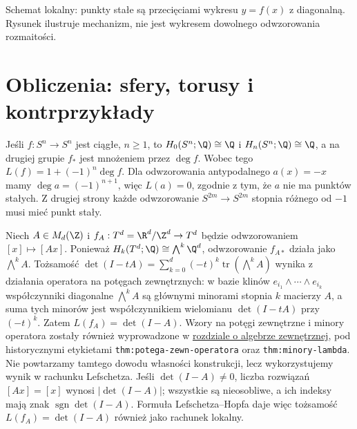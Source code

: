 \begin{center}
\end{center}
\begin{center}\small Schemat lokalny: punkty stałe są przecięciami
wykresu $y=f(x)$ z diagonalną. Rysunek ilustruje mechanizm,
nie jest wykresem dowolnego odwzorowania rozmaitości.\end{center}

\section{Obliczenia: sfery, torusy i kontrprzykłady}
\begin{przyklad}
Jeśli $f:S^n\to S^n$ jest ciągłe, $n\ge1$,
to $H_0(S^n;\Q)\cong\Q$ i $H_n(S^n;\Q)\cong\Q$,
a na drugiej grupie $f_*$ jest mnożeniem przez $\deg f$.
Wobec tego $L(f)=1+(-1)^n\deg f$.
Dla odwzorowania antypodalnego $a(x)=-x$ mamy
$\deg a=(-1)^{n+1}$, więc $L(a)=0$, zgodnie z tym,
że $a$ nie ma punktów stałych.
Z drugiej strony każde odwzorowanie $S^{2m}\to S^{2m}$
stopnia różnego od $-1$ musi mieć punkt stały.
\end{przyklad}

\begin{przyklad}
Niech $A\in M_d(\Z)$ i $f_A:T^d=\R^d/\Z^d\to T^d$
będzie odwzorowaniem $[x]\mapsto[Ax]$. Ponieważ
$H_k(T^d;\Q)\cong\bigwedge^k\Q^d$,
odwzorowanie $f_{A*}$ działa jako $\bigwedge^k A$.
Tożsamość
$\det(I-tA)=\sum_{k=0}^d(-t)^k
 \operatorname{tr}(\bigwedge^kA)$ wynika z działania
operatora na potęgach zewnętrznych: w bazie klinów
$e_{i_1}\wedge\cdots\wedge e_{i_k}$ współczynniki
diagonalne $\bigwedge^kA$ są głównymi minorami stopnia $k$
macierzy $A$, a suma tych minorów jest współczynnikiem
wielomianu $\det(I-tA)$ przy $(-t)^k$.
Zatem $L(f_A)=\det(I-A)$.
Wzory na potęgi zewnętrzne i minory operatora
zostały również wyprowadzone w
\href{https://github.com/dariusz-piekarz/mathematical_scipts/blob/biblioteka-matematyczna-iteracja-6/chapters/pl/differential_geometry_and_topology/03-algebra-tensorowa-i-zewnetrzna.tex}{rozdziale o algebrze zewnętrznej},
pod historycznymi etykietami
\texttt{thm:potega-zewn-operatora} oraz
\texttt{thm:minory-lambda}. Nie powtarzamy tamtego dowodu
własności konstrukcji, lecz wykorzystujemy wynik w rachunku Lefschetza.
Jeśli $\det(I-A)\ne0$, liczba rozwiązań $[Ax]=[x]$
wynosi $|\det(I-A)|$; wszystkie są nieosobliwe,
a ich indeksy mają znak $\operatorname{sgn}\det(I-A)$.
Formuła Lefschetza--Hopfa daje więc tożsamość
$L(f_A)=\det(I-A)$ również jako rachunek lokalny.
\end{przyklad}

